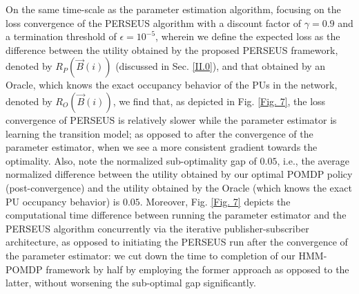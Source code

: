 \documentclass[12pt, draftcls, onecolumn]{IEEEtran}
\begin{document}
On the same time-scale as the parameter estimation algorithm, focusing on the loss convergence of the PERSEUS algorithm with a discount factor of $\gamma{=}0.9$ and a termination threshold of $\epsilon{=}10^{-5}$, wherein we define the expected loss as the difference between the utility obtained by the proposed PERSEUS framework, denoted by $R_{P}(\vec{B}(i))$ (discussed in Sec. \ref{II.0}), and that obtained by an Oracle, which knows the exact occupancy behavior of the PUs in the network, denoted by $R_{O}(\vec{B}(i))$, we find that, as depicted in Fig. \ref{Fig. 7}, the loss convergence of PERSEUS is relatively slower while the parameter estimator is learning the transition model; as opposed to after the convergence of the parameter estimator, when we see a more consistent gradient towards the optimality. Also, note the normalized sub-optimality gap of $0.05$, i.e., the average normalized difference between the utility obtained by our optimal POMDP policy (post-convergence) and the utility obtained by the Oracle (which knows the exact PU occupancy behavior) is $0.05$. Moreover, Fig. \ref{Fig. 7} depicts the computational time difference between running the parameter estimator and the PERSEUS algorithm concurrently via the iterative publisher-subscriber architecture, as opposed to initiating the PERSEUS run after the convergence of the parameter estimator: we cut down the time to completion of our HMM-POMDP framework by half by employing the former approach as opposed to the latter, without worsening the sub-optimal gap significantly.
\end{document}
